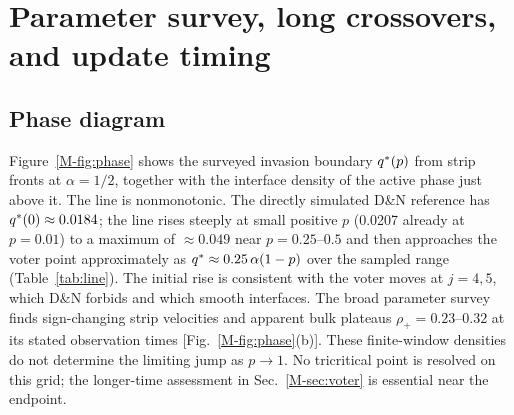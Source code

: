 \section{Parameter survey, long crossovers, and update timing}
\label{sec:sline}

\subsection{Phase diagram}
\label{sec:sphase}

Figure~\ref{M-fig:phase} shows the surveyed invasion boundary $q^{*}(p)$ from strip fronts at $\alpha = 1/2$,
together with the interface density of the active phase just above it. The line is nonmonotonic.
The directly simulated D\&N reference has $q^{*}(0)\approx0.0184$; the line
rises steeply at small positive $p$ (0.0207 already at $p = 0.01$)
to a maximum of $\approx 0.049$ near $p = 0.25$--$0.5$ and then approaches the voter
point approximately as $q^{*}\approx 0.25\,\alpha(1-p)$ over the sampled range
(Table~\ref{tab:line}). The initial rise is consistent with the voter
moves at $j = 4,5$, which D\&N forbids and which smooth interfaces.
The broad parameter survey finds sign-changing strip velocities and apparent
bulk plateaus $\rho_+ = 0.23$--$0.32$ at its stated observation times
[Fig.~\ref{M-fig:phase}(b)]. These finite-window densities do not determine the
limiting jump as $p\to1$. No tricritical point is resolved on this grid;
the longer-time assessment in Sec.~\ref{M-sec:voter} is essential near the endpoint.

